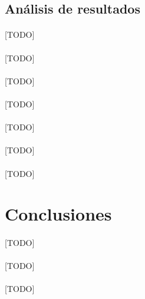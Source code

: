 \documentclass{subfiles}
\begin{document}
      \subsection{Análisis de resultados}
      \label{sec:results_analysis}

        \paragraph{}
        [TODO]

        \paragraph{}
        [TODO]

        \paragraph{}
        [TODO]

        \paragraph{}
        [TODO]

        \paragraph{}
        [TODO]

        \paragraph{}
        [TODO]

        \paragraph{}
        [TODO]

    \section{Conclusiones}
    \label{sec:implementation_results_conclusions}

      \paragraph{}
      [TODO]

      \paragraph{}
      [TODO]

      \paragraph{}
      [TODO]
\end{document}
